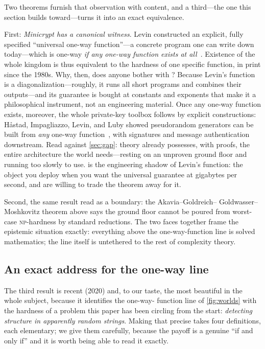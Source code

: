 Two theorems furnish that observation with content, and a third---the
one this section builds toward---turns it into an exact equivalence.

First: \emph{Minicrypt has a canonical witness}. Levin constructed an
explicit, fully specified ``universal one-way function''---a concrete
program one can write down today---which is one-way \emph{if any one-way
function exists at all}~\citep[the tale, and the construction, are told
in][]{Levin2003}. Existence of the whole kingdom is thus equivalent to
the hardness of one specific function, in print since the 1980s. Why,
then, does anyone bother with \SHA{}? Because Levin's function is a
diagonalization---roughly, it runs all short programs and combines
their outputs---and its guarantee is bought at constants and exponents
that make it a philosophical instrument, not an engineering material.
Once any one-way function exists, moreover, the whole private-key
toolbox follows by explicit constructions: H{\aa}stad, Impagliazzo,
Levin, and Luby showed pseudorandom generators can be built from
\emph{any} one-way function~\citep{HILL1999}, with signatures and
message authentication downstream. Read against \cref{sec:gap}: theory
already possesses, with proofs, the entire architecture the world
needs---resting on an unproven ground floor and running too slowly to
use. \SHA{} is the engineering shadow of Levin's function: the object
you deploy when you want the universal guarantee at gigabytes per
second, and are willing to trade the theorem away for it.

Second, the same result read as a boundary: the Akavia--Goldreich--%
Goldwasser--Moshkovitz theorem above says the ground floor cannot be
poured from worst-case \textsc{np}-hardness by standard reductions. The
two faces together frame the epistemic situation exactly: everything
above the one-way-function line is solved mathematics; the line itself
is untethered to the rest of complexity theory.

\subsection{An exact address for the one-way line}\label{sec:liupass}

The third result is recent (2020) and, to our taste, the most
beautiful in the whole subject, because it identifies the one-way-%
function line of \cref{fig:worlds} with the hardness of a problem this
paper has been circling from the start: \emph{detecting structure in
apparently random strings}. Making that precise takes four definitions,
each elementary; we give them carefully, because the payoff is a genuine
``if and only if'' and it is worth being able to read it exactly.

